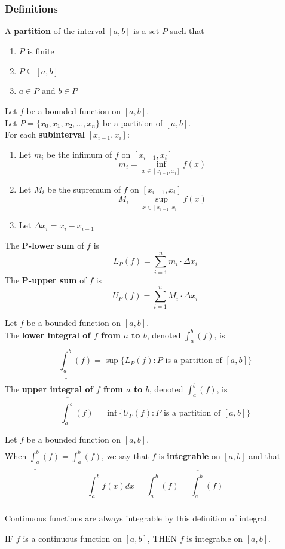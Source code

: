 \documentclass[10pt]{article}
\newenvironment{definition}[1][]{\begin{tcolorbox}[colframe=_orange,colback=_orange2,title=Definition. \ifthenelse{\isempty{#1}}{}{(#1)}
]}{\end{tcolorbox}}
\newenvironment{theorem}[1][]{\begin{tcolorbox}[colframe=_blue,colback=_blue2,title=Theorem. \ifthenelse{\isempty{#1}}{}{(#1)}
]}{\end{tcolorbox}}
\begin{document}
\subsubsection{Definitions}
\begin{definition}[Partition]
    A \textbf{partition} of the interval $[a,b]$ is a set $P$ such that
    \begin{enumerate}
        \item $P$ is finite
        \item $P\subseteq[a,b]$
        \item $a\in P$ and $b\in P$
    \end{enumerate}
\end{definition}
\begin{definition}[Upper and Lower Sums]
    Let $f$ be a bounded function on $[a,b]$. \\
    Let $P=\{x_0,x_1,x_2,\dots,x_n\}$ be a partition of $[a,b]$. \\
    For each \textbf{subinterval} $[x_{i-1}, x_i]$:
    \begin{enumerate}
        \item Let $m_i$ be the infimum of $f$ on $[x_{i-1},x_i]$
              $$
                  m_i=\inf_{x\in[x_{i-1},x_i]}f(x)
              $$
        \item Let $M_i$ be the supremum of $f$ on $[x_{i-1},x_i]$
              $$
                  M_i=\sup_{x\in[x_{i-1},x_i]}f(x)
              $$
        \item Let $\Delta x_i=x_i-x_{i-1}$
    \end{enumerate}
    The \textbf{P-lower sum} of $f$ is
    $$
        L_P(f)=\sum_{i=1}^n m_i\cdot \Delta x_i
    $$
    The \textbf{P-upper sum} of $f$ is
    $$
        U_P(f)=\sum_{i=1}^n M_i\cdot \Delta x_i
    $$
\end{definition}
\begin{definition}[Upper and Lower Integral]
    Let $f$ be a bounded function on $[a,b]$. \\
    The \textbf{lower integral of $f$ from $a$ to $b$}, denoted $\underline{\int^b_a}(f)$, is
    $$
        \underline{\int^b_a}(f)=\sup\{L_P(f):P\text{ is a partition of }[a,b]\}
    $$
    The \textbf{upper integral of $f$ from $a$ to $b$}, denoted $\overline{\int^b_a}(f)$, is
    $$
        \overline{\int^b_a}(f)=\inf\{U_P(f):P\text{ is a partition of }[a,b]\}
    $$
\end{definition}
\begin{definition}[Darboux Integrability]
    Let $f$ be a bounded function on $[a,b]$. \\
    When $\underline{\int^b_a}(f)=\overline{\int^b_a}(f)$, we say that $f$ is \textbf{integrable} on $[a,b]$ and that
    $$
        \int^b_a f(x)dx=\underline{\int^b_a}(f)=\overline{\int^b_a}(f)
    $$
\end{definition}
Continuous functions are always integrable by this definition of integral.
\begin{theorem}
    IF $f$ is a continuous function on $[a,b]$, THEN $f$ is integrable on $[a,b]$.
\end{theorem}
\end{document}
